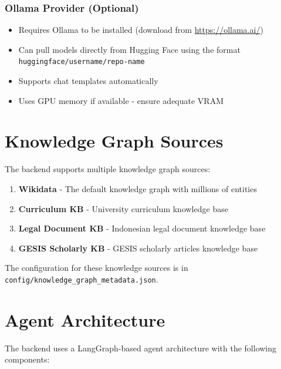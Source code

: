 \subsubsection*{Ollama Provider (Optional)}

\begin{itemize}
    \item Requires Ollama to be installed (download from \url{https://ollama.ai/})
    \item Can pull models directly from Hugging Face using the format \texttt{huggingface/username/repo-name}
    \item Supports chat templates automatically
    \item Uses GPU memory if available - ensure adequate VRAM
\end{itemize}

\section*{Knowledge Graph Sources}

The backend supports multiple knowledge graph sources:

\begin{enumerate}
    \item \textbf{Wikidata} - The default knowledge graph with millions of entities
    \item \textbf{Curriculum KB} - University curriculum knowledge base
    \item \textbf{Legal Document KB} - Indonesian legal document knowledge base
    \item \textbf{GESIS Scholarly KB} - GESIS scholarly articles knowledge base
\end{enumerate}

The configuration for these knowledge sources is in \texttt{config/knowledge\_graph\_metadata.json}.

\section*{Agent Architecture}

The backend uses a LangGraph-based agent architecture with the following components:


